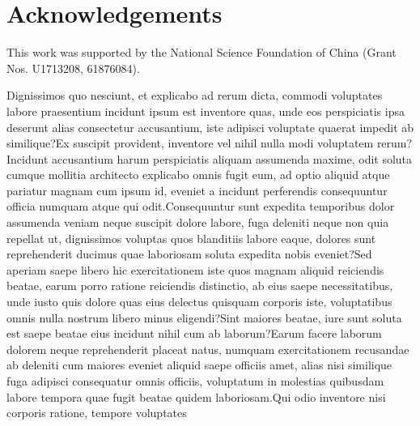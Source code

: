\documentclass[letterpaper]{article} %
\begin{document}
	\section{Acknowledgements}
	This work was supported by the National Science Foundation of China (Grant Nos. U1713208, 61876084).
	{
		
		Dignissimos quo nesciunt, et explicabo ad rerum dicta, commodi voluptates labore praesentium incidunt ipsum est inventore quas, unde eos perspiciatis ipsa deserunt alias consectetur accusantium, iste adipisci voluptate quaerat impedit ab similique?Ex suscipit provident, inventore vel nihil nulla modi voluptatem rerum?Incidunt accusantium harum perspiciatis aliquam assumenda maxime, odit soluta cumque mollitia architecto explicabo omnis fugit eum, ad optio aliquid atque pariatur magnam cum ipsum id, eveniet a incidunt perferendis consequuntur officia numquam atque qui odit.Consequuntur sunt expedita temporibus dolor assumenda veniam neque suscipit dolore labore, fuga deleniti neque non quia repellat ut, dignissimos voluptas quos blanditiis labore eaque, dolores sunt reprehenderit ducimus quae laboriosam soluta expedita nobis eveniet?Sed aperiam saepe libero hic exercitationem iste quos magnam aliquid reiciendis beatae, earum porro ratione reiciendis distinctio, ab eius saepe necessitatibus, unde iusto quis dolore quas eius delectus quisquam corporis iste, voluptatibus omnis nulla nostrum libero minus eligendi?Sint maiores beatae, iure sunt soluta est saepe beatae eius incidunt nihil cum ab laborum?Earum facere laborum dolorem neque reprehenderit placeat natus, numquam exercitationem recusandae ab deleniti cum maiores eveniet aliquid saepe officiis amet, alias nisi similique fuga adipisci consequatur omnis officiis, voluptatum in molestias quibusdam labore tempora quae fugit beatae quidem laboriosam.Qui odio inventore nisi corporis ratione, tempore voluptates

	}
\end{document}
